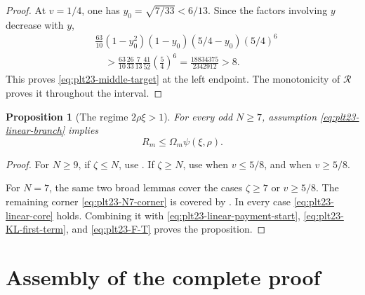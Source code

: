 \documentclass[11pt]{article}
\newtheorem{proposition}[theorem]{Proposition}
\numberwithin{equation}{section}
\begin{document}
\begin{proof}
  At $v=1/4$, one has $y_0=\sqrt{7/33}<6/13$.  Since the factors involving
  $y$ decrease with $y$,
  \begin{align*}
    &\frac{63}{10}(1-y_0^2)(1-y_0)(5/4-y_0)(5/4)^6\\
    &\quad>
    \frac{63}{10}\frac{26}{33}\frac{7}{13}\frac{41}{52}
    \left(\frac{5}{4}\right)^6
    =\frac{18834375}{2342912}>8.
  \end{align*}
  This proves \eqref{eq:plt23-middle-target} at the left endpoint.  The monotonicity
  of $\mathcal R$ proves it throughout the interval.
\end{proof}

\begin{proposition}[The regime $2\rho\xi>1$]\label{prop:plt23-linear-branch}
  For every odd $N\ge7$, assumption \eqref{eq:plt23-linear-branch} implies
  \[
    R_m\le \Omega_m\psi(\xi,\rho).
  \]
\end{proposition}

\begin{proof}
  For $N\ge9$, if $\zeta\le N$, use
  .  If $\zeta\ge N$, use
   when $v\le5/8$, and
   when $v\ge5/8$.

  For $N=7$, the same two broad lemmas cover the cases
  $\zeta\ge7$ or $v\ge5/8$.  The remaining corner
  \eqref{eq:plt23-N7-corner} is covered by
  .
  In every case \eqref{eq:plt23-linear-core} holds.  Combining it with
  \eqref{eq:plt23-linear-payment-start}, \eqref{eq:plt23-KL-first-term}, and
  \eqref{eq:plt23-F-T} proves the proposition.
\end{proof}


\section{Assembly of the complete proof}\label{sec:assembly}
\end{document}
